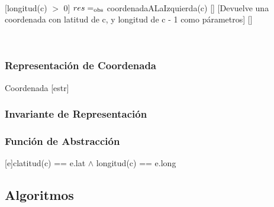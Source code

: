 ~

[longitud(c) $>$ 0]
{$res =_{\mathrm{obs}}$ coordenadaALaIzquierda(c)}
[]%
[Devuelve una coordenada con latitud de c, y longitud de c - 1 como párametros]
[]

~

\subsubsection{Representación de Coordenada}

\begin{Estructura}{ Coordenada }[estr]
	\begin{Tupla}[estr]
	\end{Tupla}

\end{Estructura}


\subsubsection{Invariante de Representación}


\subsubsection{Función de Abstracción}

[e]{c}{latitud(c) == e.lat $\land$ longitud(c) == e.long}

\subsection{Algoritmos}

\begin{algorithm}[H]
\end{algorithm}




